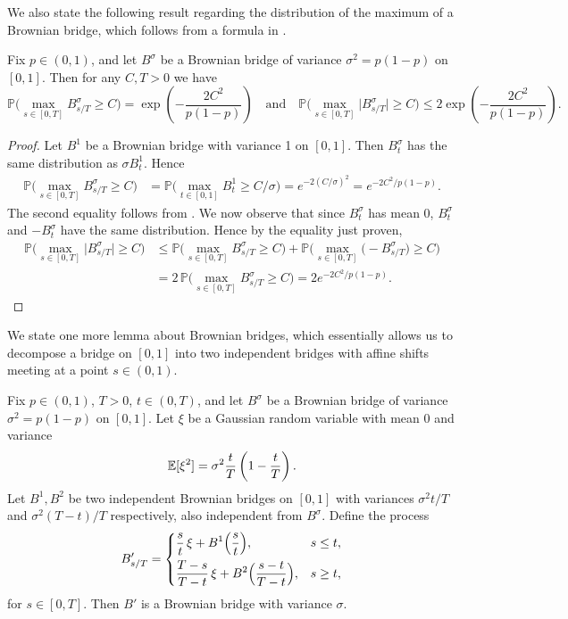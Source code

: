 We also state the following result regarding the distribution of the maximum of a Brownian bridge, which follows from a formula in \cite[Chapter 4]{KS}.

\begin{lemma}\label{BBmax}
	Fix $p\in (0,1)$, and let $B^\sigma$ be a Brownian bridge of variance $\sigma^2 = p(1-p)$ on $[0,1]$. Then for any $C,T> 0$ we have
	\[
	\mathbb{P}\Big(\max_{s\in[0,T]} B^\sigma_{s/T} \geq C\Big) = \exp\left( - \frac{2C^2}{p(1-p)}\right) \quad \mathrm{and} \quad \mathbb{P}\Big(\max_{s\in[0,T]} \big|B^\sigma_{s/T}\big| \geq C\Big) \leq 2\exp\left( - \frac{2C^2}{p(1-p)}\right).
	\]
\end{lemma}

\begin{proof}
	Let $B^1$ be a Brownian bridge with variance 1 on $[0,1]$. Then $B^\sigma_t$ has the same distribution as $\sigma B^1_t$. Hence
	\begin{align*}
	\mathbb{P}\Big( \max_{s\in[0,T]} B^\sigma_{s/T} \geq C \Big) &= \mathbb{P}\Big( \max_{t\in[0,1]} B^1_t \geq C/\sigma \Big) = e^{-2(C/\sigma)^2} = e^{-2C^2/p(1-p)}.
	\end{align*}
	The second equality follows from \cite[Chapter 4, (3.40)]{KS}. We now observe that since $B^\sigma_t$ has mean 0, $B^\sigma_t$ and $-B^\sigma_t$ have the same distribution. Hence by the equality just proven,
	\begin{align*}
	\mathbb{P}\Big( \max_{s\in[0,T]} \big| B^\sigma_{s/T}\big| \geq C \Big) &\leq \mathbb{P}\Big( \max_{s\in[0,T]}  B^\sigma_{s/T} \geq C \Big) + \mathbb{P}\Big( \max_{s\in[0,T]}  \big(-B^\sigma_{s/T}\big) \geq C \Big)\\
	&= 2\,\mathbb{P}\Big( \max_{s\in[0,T]}  B^\sigma_{s/T} \geq C \Big) = 2e^{-2C^2/p(1-p)}.
	\end{align*}
\end{proof}

We state one more lemma about Brownian bridges, which essentially allows us to decompose a bridge on $[0,1]$ into two independent bridges with affine shifts meeting at a point $s\in (0,1)$.

\begin{lemma}\label{2bridges}
	Fix $p\in (0,1)$, $T>0$, $t\in(0,T)$, and let $B^\sigma$ be a Brownian bridge of variance $\sigma^2 = p(1-p)$ on $[0,1]$. Let $\xi$ be a Gaussian random variable with mean 0 and variance
	\[
	\mathbb{E}[\xi^2] = \sigma^2\frac{t}{T}\left(1-\frac{t}{T}\right).
	\]
	Let $B^1,B^2$ be two independent Brownian bridges on $[0,1]$ with variances $\sigma^2 t/T$ and $\sigma^2(T-t)/T$ respectively, also independent from $B^\sigma$. Define the process
	\[
	B'_{s/T} = \begin{dcases}
	\frac{s}{t}\,\xi + B^1\Big(\frac{s}{t}\Big), & s\leq t,\\
	\frac{T-s}{T-t}\,\xi + B^2\Big(\frac{s-t}{T-t}\Big), & s\geq t,
	\end{dcases}
	\]
	for $s\in [0,T]$. Then $B'$ is a Brownian bridge with variance $\sigma$.
\end{lemma}

